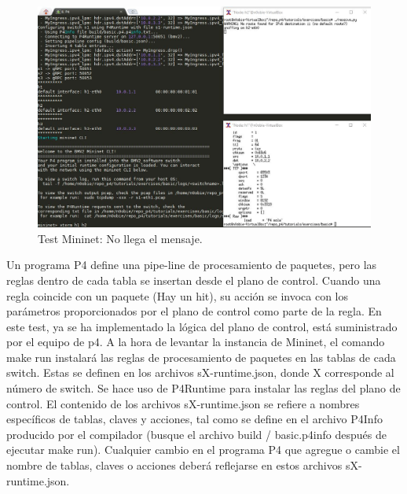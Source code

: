 \begin{figure}[!htb]
  \centering
    \includegraphics[width=\linewidth]{./img/test/1.JPG}
    \caption{Test Mininet: No llega el mensaje.}
  \label{fig:yo}
\end{figure}


Un programa P4 define una pipe-line de procesamiento de paquetes, pero las reglas dentro de cada tabla se insertan desde el plano de control. Cuando una regla coincide con un paquete (Hay un hit), su acción se invoca con los parámetros proporcionados por el plano de control como parte de la regla.\newline
\newline
En este test, ya se ha implementado la lógica del plano de control, está suministrado por el equipo de p4. A la hora de levantar la instancia de Mininet, el comando make run instalará las reglas de procesamiento de paquetes en las tablas de cada switch. Estas se definen en los archivos sX-runtime.json, donde X corresponde al número de switch.\newline
\newline
Se hace uso de P4Runtime para instalar las reglas del plano de control. El contenido de los archivos sX-runtime.json se refiere a nombres específicos de tablas, claves y acciones, tal como se define en el archivo P4Info producido por el compilador (busque el archivo build / basic.p4info después de ejecutar make run). Cualquier cambio en el programa P4 que agregue o cambie el nombre de tablas, claves o acciones deberá reflejarse en estos archivos sX-runtime.json.

